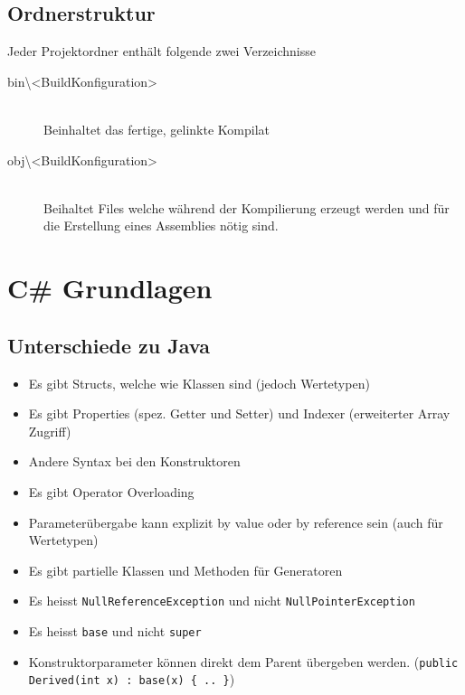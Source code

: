 \subsection{Ordnerstruktur}
Jeder Projektordner enthält folgende zwei Verzeichnisse
\begin{description}
	\item[bin\textbackslash<BuildKonfiguration>] \hfill \\
	Beinhaltet das fertige, gelinkte Kompilat
	\item[obj\textbackslash<BuildKonfiguration>] \hfill \\
	Beihaltet Files welche während der Kompilierung erzeugt werden und für die Erstellung eines Assemblies nötig sind.
\end{description}


\section{C\# Grundlagen}
\subsection{Unterschiede zu Java}
\begin{itemize}
	\item Es gibt Structs, welche wie Klassen sind (jedoch Wertetypen)
	\item Es gibt Properties (spez. Getter und Setter) und Indexer (erweiterter Array Zugriff)
	\item Andere Syntax bei den Konstruktoren
	\item Es gibt Operator Overloading
	\item Parameterübergabe kann explizit by value oder by reference sein (auch für Wertetypen)
	\item Es gibt partielle Klassen und Methoden für Generatoren
	\item Es heisst \lstinline|NullReferenceException| und nicht \lstinline|NullPointerException|
	\item Es heisst \lstinline|base| und nicht \lstinline|super|
	\item Konstruktorparameter können direkt dem Parent übergeben werden. (\lstinline|public Derived(int x) : base(x) { .. }|)
\end{itemize}

